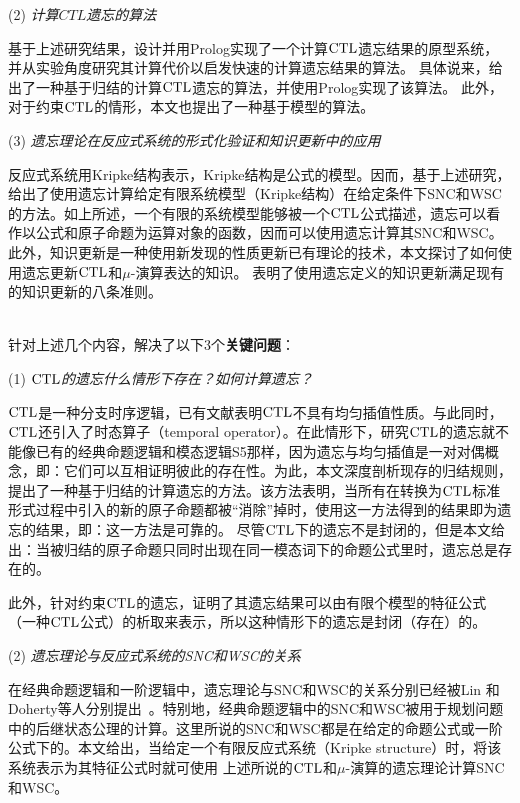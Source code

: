(2) {\em 计算$CTL$遗忘的算法}

基于上述研究结果，设计并用Prolog实现了一个计算$\textrm{CTL}$遗忘结果的原型系统，并从实验角度研究其计算代价以启发快速的计算遗忘结果的算法。
具体说来，给出了一种基于归结的计算$\textrm{CTL}$遗忘的算法，并使用Prolog实现了该算法。
此外，对于约束$\textrm{CTL}$的情形，本文也提出了一种基于模型的算法。

(3) {\em 遗忘理论在反应式系统的形式化验证和知识更新中的应用}

反应式系统用Kripke结构表示，Kripke结构是公式的模型。因而，基于上述研究，给出了使用遗忘计算给定有限系统模型（Kripke结构）在给定条件下SNC和WSC的方法。如上所述，一个有限的系统模型能够被一个$\textrm{CTL}$公式描述，遗忘可以看作以公式和原子命题为运算对象的函数，因而可以使用遗忘计算其SNC和WSC。
此外，知识更新是一种使用新发现的性质更新已有理论的技术，本文探讨了如何使用遗忘更新$\textrm{CTL}$和$\mu$-演算表达的知识。
表明了使用遗忘定义的知识更新满足现有的知识更新的八条准则。

~\\
针对上述几个内容，解决了以下3个\textbf{关键问题}：

(1) {\em $\textrm{CTL}$的遗忘什么情形下存在？如何计算遗忘？}

$\textrm{CTL}$是一种分支时序逻辑，已有文献表明$\textrm{CTL}$不具有均匀插值性质。与此同时，$\textrm{CTL}$还引入了时态算子（temporal operator）。在此情形下，研究$\textrm{CTL}$的遗忘就不能像已有的经典命题逻辑和模态逻辑S5那样，因为遗忘与均匀插值是一对对偶概念，即：它们可以互相证明彼此的存在性。为此，本文深度剖析现存的归结规则，提出了一种基于归结的计算遗忘的方法。该方法表明，当所有在转换为$\textrm{CTL}$标准形式过程中引入的新的原子命题都被“消除”掉时，使用这一方法得到的结果即为遗忘的结果，即：这一方法是可靠的。
尽管$\textrm{CTL}$下的遗忘不是封闭的，但是本文给出：当被归结的原子命题只同时出现在同一模态词下的命题公式里时，遗忘总是存在的。

此外，针对约束$\textrm{CTL}$的遗忘，证明了其遗忘结果可以由有限个模型的特征公式（一种$\textrm{CTL}$公式）的析取来表示，所以这种情形下的遗忘是封闭（存在）的。

(2) {\em 遗忘理论与反应式系统的SNC和WSC的关系}

在经典命题逻辑和一阶逻辑中，遗忘理论与SNC和WSC的关系分别已经被Lin 和 Doherty等人分别提出~\cite{DBLP:journals/ai/Lin01,DBLP:conf/ijcai/DohertyLS01}。特别地，经典命题逻辑中的SNC和WSC被用于规划问题中的后继状态公理的计算。这里所说的SNC和WSC都是在给定的命题公式或一阶公式下的。本文给出，当给定一个有限反应式系统（Kripke structure）时，将该系统表示为其特征公式时就可使用
上述所说的$\textrm{CTL}$和$\mu$-演算的遗忘理论计算SNC和WSC。



